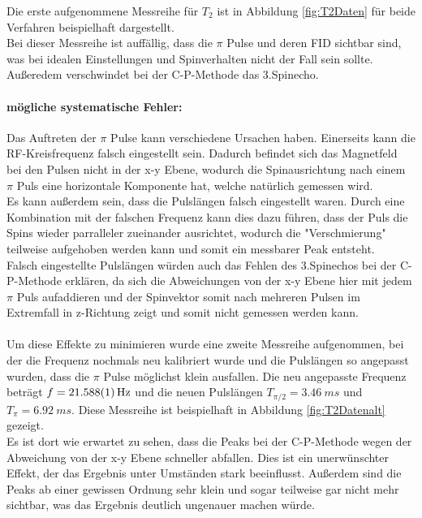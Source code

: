 \documentclass[12pt,a4paper]{article}
\begin{document}
Die erste aufgenommene Messreihe für $T_2$ ist in Abbildung \ref{fig:T2Daten} für beide Verfahren beispielhaft dargestellt.\\
Bei dieser Messreihe ist auffällig, dass die $\pi$ Pulse und deren FID sichtbar sind, was bei idealen Einstellungen und Spinverhalten nicht der Fall sein sollte. Außeredem verschwindet bei der C-P-Methode das 3.Spinecho.
\paragraph{mögliche systematische Fehler:}

Das Auftreten der $\pi$ Pulse kann verschiedene Ursachen haben. Einerseits kann die RF-Kreisfrequenz falsch eingestellt sein. Dadurch befindet sich das Magnetfeld bei den Pulsen nicht in der x-y Ebene, wodurch die Spinausrichtung nach einem $\pi$ Puls eine horizontale Komponente hat, welche natürlich gemessen wird.\\
Es kann außerdem sein, dass die Pulslängen falsch eingestellt waren. Durch eine Kombination mit der falschen Frequenz kann dies dazu führen, dass der Puls die Spins wieder parralleler zueinander ausrichtet, wodurch die "Verschmierung" teilweise aufgehoben werden kann und somit ein messbarer Peak entsteht.\\
Falsch eingestellte Pulslängen würden auch das Fehlen des 3.Spinechos  bei der C-P-Methode erklären, da sich die Abweichungen von der x-y Ebene hier mit jedem $\pi$ Puls aufaddieren und der Spinvektor somit nach mehreren Pulsen im Extremfall in z-Richtung zeigt und somit nicht gemessen werden kann.\\
\\
Um diese Effekte zu minimieren wurde eine zweite Messreihe aufgenommen, bei der die Frequenz nochmals neu kalibriert wurde und die Pulslängen so angepasst wurden, dass die $\pi$ Pulse möglichst klein ausfallen. Die neu angepasste Frequenz beträgt $f = \SI{21.588\pm 0.001}{Hz}$ und die neuen Pulslängen $T_{\pi /2} = \SI{3.46}{ms}$ und $T_{\pi} = \SI{6.92}{ms}$. Diese Messreihe ist beispielhaft in Abbildung \ref{fig:T2Datenalt} gezeigt.\\
Es ist dort wie erwartet zu sehen, dass die Peaks bei der C-P-Methode wegen der Abweichung von der x-y Ebene schneller abfallen. Dies ist ein unerwünschter Effekt, der das Ergebnis unter Umständen stark beeinflusst. Außerdem sind die Peaks ab einer gewissen Ordnung sehr klein und sogar teilweise gar nicht mehr sichtbar, was das Ergebnis deutlich ungenauer machen würde.\\
\end{document}
